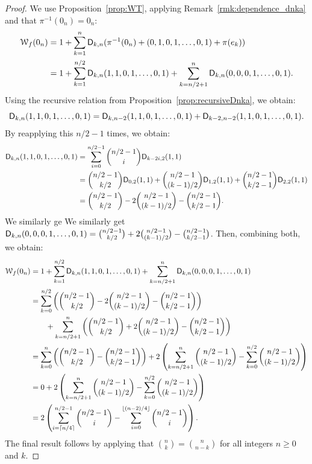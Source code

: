 \documentclass[11pt]{llncs}
\begin{document}
\begin{proof}
	We use Proposition~\ref{prop:WT}, applying Remark~\ref{rmk:dependence_dnka} and that $\pi^{-1}(0_n)=0_n$:
	\begin{align*}
		\wt{f}(0_n)&=1+\sum_{k=1}^n\Dnka{n}{k}{\pi^{-1}(0_n)+(0,1,0,1,\ldots,0,1)+\pi(e_k)}\\
		&=1+\sum_{k=1}^{n/2}\Dnka{n}{k}{1,1,0,1,\ldots,0,1}+\sum_{k=n/2+1}^{n}\Dnka{n}{k}{0,0,0,1,\ldots,0,1}.
	\end{align*}
	Using the recursive relation from Proposition~\ref{prop:recursiveDnka}, we obtain:
	\[
		\Dnka{n}{k}{1,1,0,1,\ldots,0,1}=\Dnka{n-2}{k}{1,1,0,1,\ldots,0,1} +\Dnka{n-2}{k-2}{1,1,0,1,\ldots,0,1}.
	\]
	By reapplying this $n/2-1$ times, we obtain:
	\begin{align*}
\Dnka{n}{k}{1,1,0,1,\ldots,0,1}&=\sum_{i=0}^{n/2-1} \binom{n/2-1}{i} \Dnka{2}{k-2i}{1,1}\\
&=\binom{n/2-1}{k/2} \Dnka{2}{0}{1,1}+ \binom{n/2-1}{(k-1)/2} \Dnka{2}{1}{1,1}+ \binom{n/2-1}{k/2-1} \Dnka{2}{2}{1,1}\\
&=\binom{n/2-1}{k/2}-2\binom{n/2-1}{(k-1)/2}-\binom{n/2-1}{k/2-1}.
\end{align*}
We similarly ge
	We similarly get $\Dnka{n}{k}{0,0,0,1,\ldots,0,1}=\binom{n/2-1}{k/2} +2 \binom{n/2-1}{(k-1)/2}-\binom{n/2-1}{k/2-1}$. Then, combining both, we obtain:
	\begin{align*}
		\wt{f}(0_n)&=1+\sum_{k=1}^{n/2}\Dnka{n}{k}{1,1,0,1,\ldots,0,1}+ \sum_{k=n/2+1}^{n}\Dnka{n}{k}{0,0,0,1,\ldots,0,1}\\
		&=\sum_{k=0}^{n/2} \left(\binom{n/2-1}{k/2} -2 \binom{n/2-1}{(k-1)/2}-\binom{n/2-1}{k/2-1}\right)\\
		&\qquad+\sum_{k=n/2+1}^{n}\left(\binom{n/2-1}{k/2}+2\binom{n/2-1}{(k-1)/2}-\binom{n/2-1}{k/2-1}\right)\\
		&=\sum_{k=0}^{n}\left( \binom{n/2-1}{k/2}-\binom{n/2-1}{k/2-1}\right)+2\left(\sum_{k=n/2+1}^{n}\binom{n/2-1}{(k-1)/2}-\sum_{k=0}^{n/2}\binom{n/2-1}{(k-1)/2}\right)\\
		&=0+2\left(\sum_{k=n/2+1}^{n}\binom{n/2-1}{(k-1)/2}-\sum_{k=0}^{n/2} \binom{n/2-1}{(k-1)/2}\right)\\
		&=2\left(\sum_{i=\lceil n/4\rceil}^{n/2-1} \binom {n/2-1}{i} - \sum_{i=0}^{\lfloor(n-2)/4\rfloor} \binom{n/2-1}{i}\right).
	\end{align*}
	The final result follows by applying that $\binom{n}{k}=\binom{n}{n-k}$ for all integers $n\geq 0$ and $k$.
\end{proof}
\end{document}
